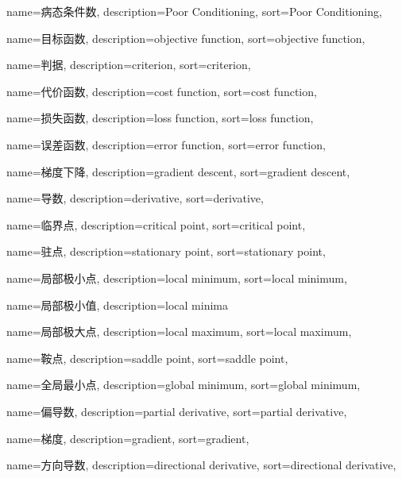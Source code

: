 {
  name=病态条件数,
  description={Poor Conditioning},
  sort={Poor Conditioning},
}

{
  name=目标函数,
  description={objective function},
  sort={objective function},
}

{
  name=判据,
  description={criterion},
  sort={criterion},
}

{
  name=代价函数,
  description={cost function},
  sort={cost function},
}

{
  name=损失函数,
  description={loss function},
  sort={loss function},
}

{
  name=误差函数,
  description={error function},
  sort={error function},
}

{
  name=梯度下降,
  description={gradient descent},
  sort={gradient descent},
}

{
  name=导数,
  description={derivative},
  sort={derivative},
}

{
  name=临界点,
  description={critical point},
  sort={critical point},
}

{
  name=驻点,
  description={stationary point},
  sort={stationary point},
}

{
  name=局部极小点,
  description={local minimum},
  sort={local minimum},
}

{
  name=局部极小值,
  description={local minima}
}

{
  name=局部极大点,
  description={local maximum},
  sort={local maximum},
}

{
  name=鞍点,
  description={saddle point},
  sort={saddle point},
}

{
  name=全局最小点,
  description={global minimum},
  sort={global minimum},
}

{
  name=偏导数,
  description={partial derivative},
  sort={partial derivative},
}

{
  name=梯度,
  description={gradient},
  sort={gradient},
}

{
  name=方向导数,
  description={directional derivative},
  sort={directional derivative},
}

